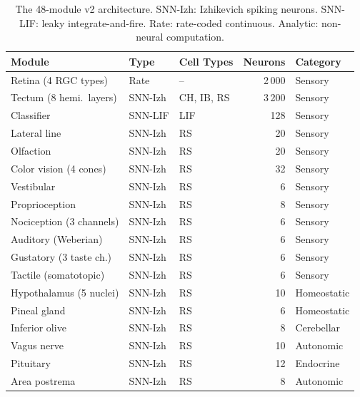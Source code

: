 \documentclass[12pt]{article}
\begin{document}
\begin{table}[H]
\centering
\caption{The 48-module v2 architecture.
  SNN-Izh: Izhikevich spiking neurons.  SNN-LIF: leaky integrate-and-fire.
  Rate: rate-coded continuous.  Analytic: non-neural computation.}
\label{tab:modules}
\small
\begin{tabular}{lllrl}
\toprule
Module & Type & Cell Types & Neurons & Category \\
\midrule
Retina (4 RGC types)      & Rate      & --          & 2\,000 & Sensory \\
Tectum (8 hemi.\ layers)  & SNN-Izh   & CH, IB, RS  & 3\,200 & Sensory \\
Classifier                & SNN-LIF   & LIF         & 128    & Sensory \\
Lateral line              & SNN-Izh   & RS          & 20     & Sensory \\
Olfaction                 & SNN-Izh   & RS          & 20     & Sensory \\
Color vision (4 cones)    & SNN-Izh   & RS          & 32     & Sensory \\
Vestibular                & SNN-Izh   & RS          & 6      & Sensory \\
Proprioception            & SNN-Izh   & RS          & 8      & Sensory \\
Nociception (3 channels)  & SNN-Izh   & RS          & 6      & Sensory \\
Auditory (Weberian)       & SNN-Izh   & RS          & 6      & Sensory \\
Gustatory (3 taste ch.)   & SNN-Izh   & RS          & 6      & Sensory \\
Tactile (somatotopic)     & SNN-Izh   & RS          & 6      & Sensory \\
Hypothalamus (5 nuclei)   & SNN-Izh   & RS          & 10     & Homeostatic \\
Pineal gland              & SNN-Izh   & RS          & 6      & Homeostatic \\
Inferior olive            & SNN-Izh   & RS          & 8      & Cerebellar \\
Vagus nerve               & SNN-Izh   & RS          & 10     & Autonomic \\
Pituitary                 & SNN-Izh   & RS          & 12     & Endocrine \\
Area postrema             & SNN-Izh   & RS          & 8      & Autonomic \\

\end{tabular}
\end{table}
\end{document}
